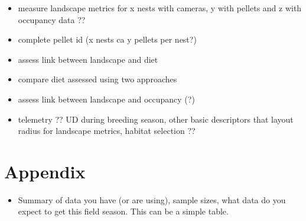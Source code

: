\documentclass[]{article}
\providecommand{\tightlist}{%
  \setlength{\itemsep}{0pt}\setlength{\parskip}{0pt}}
\begin{document}
\begin{itemize}
\tightlist
\item
  measure landscape metrics for x nests with cameras, y with pellets and
  z with occupancy data ??
\item
  complete pellet id (x nests ca y pellets per nest?)
\item
  assess link between landscape and diet
\item
  compare diet assessed using two approaches
\item
  assess link between landscape and occupancy (?)
\item
  telemetry ?? UD during breeding season, other basic descriptors that
  layout radius for landscape metrics, habitat selection ??
\end{itemize}

\section{Appendix}\label{appendix}

\begin{itemize}
\tightlist
\item
  Summary of data you have (or are using), sample sizes, what data do
  you expect to get this field season. This can be a simple table.
\end{itemize}

\end{document}
